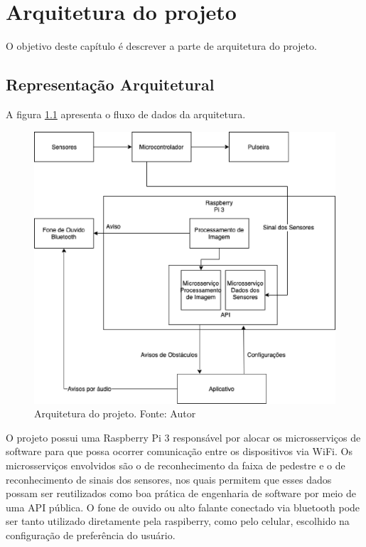 \chapter{Arquitetura do projeto}

O objetivo deste capítulo é descrever a parte de arquitetura do projeto.

\section{Representação Arquitetural}

A figura \ref{fig:arquitetura} apresenta o fluxo de dados da arquitetura.

\begin{figure}[ht]
	\centering
    \includegraphics[keepaspectratio=true,scale=0.5]{figuras/arquitetura.eps}
    \caption[Arquitetura do projeto.]{Arquitetura do projeto. Fonte: Autor}
	\label{fig:arquitetura}
\end{figure}

O projeto possui uma Raspberry Pi 3 responsável por alocar os microsserviços de software para que possa ocorrer comunicação entre os dispositivos via WiFi. Os microsserviços envolvidos são o de reconhecimento da faixa de pedestre e o de reconhecimento de sinais dos sensores, nos quais permitem que esses dados possam ser reutilizados como boa prática de engenharia de software por meio de uma API pública. O fone de ouvido ou alto falante conectado via bluetooth pode ser tanto utilizado diretamente pela raspiberry, como pelo celular, escolhido na configuração de preferência do usuário.

